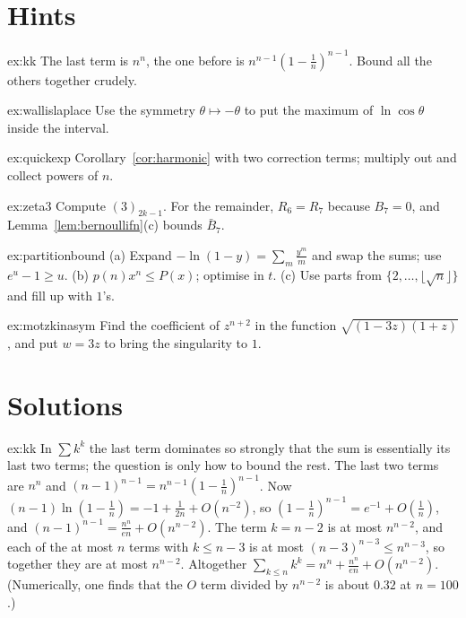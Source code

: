 \section{Hints}

\begin{hint}{ex:kk}
The last term is $n^n$, the one before is $n^{n-1}(1-\frac1n)^{n-1}$. Bound all the others together crudely.
\end{hint}
\begin{hint}{ex:wallislaplace}
Use the symmetry $\theta\mapsto-\theta$ to put the maximum of $\ln\cos\theta$ inside the interval.
\end{hint}
\begin{hint}{ex:quickexp}
Corollary~\ref{cor:harmonic} with two correction terms; multiply out and collect powers of $n$.
\end{hint}
\begin{hint}{ex:zeta3}
Compute $(3)_{2k-1}$. For the remainder, $R_6=R_7$ because $B_7=0$, and Lemma~\ref{lem:bernoullifn}(c) bounds $\bar B_7$.
\end{hint}
\begin{hint}{ex:partitionbound}
(a) Expand $-\ln(1-y)=\sum_m\frac{y^m}m$ and swap the sums; use $e^u-1\ge u$. (b) $p(n)x^n\le P(x)$; optimise in $t$. (c) Use parts from $\{2,\dots,\lfloor\sqrt n\rfloor\}$ and fill up with $1$'s.
\end{hint}
\begin{hint}{ex:motzkinasym}
Find the coefficient of $z^{n+2}$ in the function $\sqrt{(1-3z)(1+z)}$, and put $w=3z$ to bring the singularity to $1$.
\end{hint}

\section{Solutions}

\begin{solution}{ex:kk}
\idea In $\sum k^k$ the last term dominates so strongly that the sum is essentially its last two terms; the question is only how to bound the rest.
\writeup The last two terms are $n^n$ and $(n-1)^{n-1}=n^{n-1}(1-\frac1n)^{n-1}$. Now $(n-1)\ln(1-\frac1n)=-1+\frac1{2n}+O(n^{-2})$, so $(1-\frac1n)^{n-1}=e^{-1}+O(\frac1n)$, and
$(n-1)^{n-1}=\frac{n^n}{en}+O(n^{n-2})$. The term $k=n-2$ is at most $n^{n-2}$, and each of the at most $n$ terms with $k\le n-3$ is at most $(n-3)^{n-3}\le n^{n-3}$, so together they are at most
$n^{n-2}$. Altogether $\sum_{k\le n}k^k=n^n+\frac{n^n}{en}+O(n^{n-2})$. (Numerically, one finds that the $O$ term divided by $n^{n-2}$ is about $0.32$ at $n=100$.)
\end{solution}

